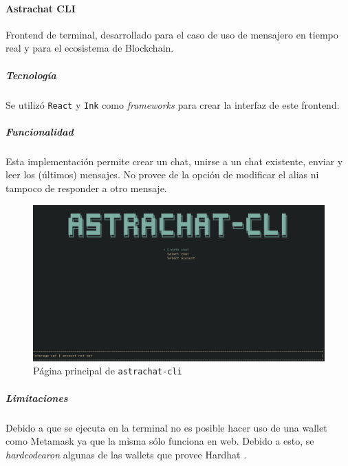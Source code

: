 \paragraph{Astrachat CLI}

Frontend de terminal, desarrollado para el caso de uso de mensajero en tiempo real y para el ecosistema de Blockchain.

\subparagraph{Tecnología}

Se utilizó \texttt{React} \cite{react} y \texttt{Ink} \cite{ink} como \textit{frameworks} para crear la interfaz de este frontend.

\subparagraph{Funcionalidad}

Esta implementación permite crear un chat, unirse a un chat existente, enviar y leer los (últimos) mensajes. No provee de la opción de modificar el alias ni tampoco de responder a otro mensaje.

\begin{figure}[H]
    \centering
    \includegraphics[width=1\linewidth]{img/astrachat-cli-main-page.png}
    \caption{Página principal de \texttt{astrachat-cli}}
    \label{fig:astrachat-cli-main-page}
\end{figure}

\subparagraph{Limitaciones}

Debido a que se ejecuta en la terminal no es posible hacer uso de una wallet como Metamask \cite{metamask} ya que la misma sólo funciona en web. Debido a esto, se \textit{hardcodearon} algunas de las wallets que provee Hardhat \cite{hardhat}.